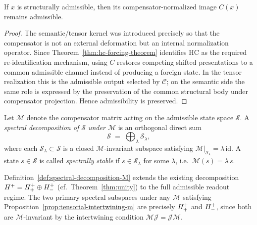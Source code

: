\begin{lemma}
\label{lem:hc-admissibility-lemma}
If $x$ is structurally admissible, then its compensator-normalized image $C(x)$
remains admissible.
\end{lemma}

\begin{proof}
The semantic/tensor kernel was introduced precisely so that the compensator is
not an external deformation but an internal normalization operator. Since
Theorem~\ref{thm:hc-forcing-theorem} identifies HC as the required
re-identification mechanism, using $C$ restores competing shifted presentations
to a common admissible channel instead of producing a foreign state. In the
tensor realization this is the admissible output selected by $\mathcal C$; on
the semantic side the same role is expressed by the preservation of the common
structural body under compensator projection. Hence admissibility is preserved.
\end{proof}


\begin{definition}
\label{def:spectral-decomposition-M}
Let $\mathcal{M}$ denote the compensator matrix acting on the admissible state
space $\mathcal{S}$. A \emph{spectral decomposition of $\mathcal{S}$ under
$\mathcal{M}$} is an orthogonal direct sum
\[
 \mathcal{S} \;=\; \bigoplus_{\lambda} \mathcal{S}_\lambda,
\]
where each $\mathcal{S}_\lambda \subset \mathcal{S}$ is a closed
$\mathcal{M}$-invariant subspace satisfying
$\mathcal{M}|_{\mathcal{S}_\lambda} = \lambda\,\mathrm{id}$.
A state $s \in \mathcal{S}$ is called \emph{spectrally stable} if
$s \in \mathcal{S}_\lambda$ for some $\lambda$, i.e.\ $\mathcal{M}(s) =
\lambda\,s$.
\end{definition}

\begin{remark}
Definition~\ref{def:spectral-decomposition-M} extends the existing
decomposition $H^+ = H^+_+ \oplus H^+_-$
(cf.\ Theorem~\ref{thm:unity}) to the full admissible readout regime.
The two primary spectral subspaces under any $\mathcal{M}$ satisfying
Proposition~\ref{prop:tensorial-intertwining-m} are precisely $H^+_+$
and $H^+_-$, since both are $\mathcal{M}$-invariant by the intertwining
condition $\mathcal{M}\mathcal{J} = \mathcal{J}\mathcal{M}$.
\end{remark}

